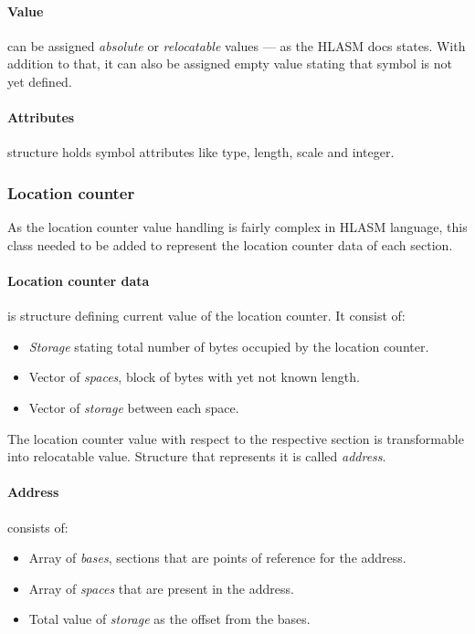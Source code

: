 \paragraph*{Value} can be assigned \emph{absolute} or \emph{relocatable} values --- as the HLASM docs states. With addition to that, it can also be assigned empty value stating that symbol is not yet defined.

\paragraph*{Attributes} structure holds symbol attributes like type, length, scale and integer.

\subsubsection{Location counter}

As the location counter value handling is fairly complex in HLASM language, this class needed to be added to represent the location counter data of each section.


\paragraph*{Location counter data} is structure defining current value of the location counter. It consist of:
\begin{itemize}
	\item \emph{Storage} stating total number of bytes occupied by the location counter.
	\item Vector of \emph{spaces}, block of bytes with yet not known length.
	\item Vector of \emph{storage} between each space.
\end{itemize}

The location counter value with respect to the respective section is transformable into relocatable value. Structure that represents it is called \emph{address}.

\paragraph*{Address} consists of:
\begin{itemize}
	\item Array of \emph{bases}, sections that are points of reference for the address.
	\item Array of \emph{spaces} that are present in the address. 
	\item Total value of \emph{storage} as the offset from the bases.
\end{itemize}


